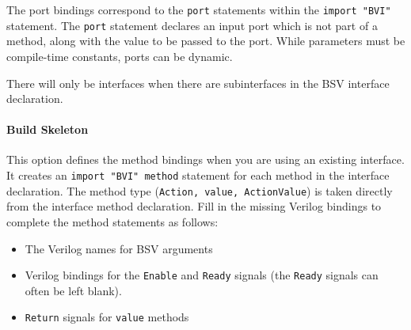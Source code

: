 \documentclass{article}
\newcommand{\te}[1]{\texttt{#1}}
\begin{document}
The port bindings correspond to the \te{port} statements within the
\te{import "BVI"} statement.  The \te{port} statement declares an input
port which is not part of a method, along with the value to be passed
to the port.  While parameters must be compile-time constants, ports
can be dynamic.

There will only be interfaces when there are subinterfaces  in the BSV
interface declaration.


\paragraph{Build Skeleton}
 This option defines the method bindings when you are using an
 existing interface.  It creates an \te{import "BVI" method}
statement for each method in the  interface declaration.  The method
type (\te{Action, value, ActionValue}) is taken directly from the
interface method declaration.  Fill in the missing
Verilog  bindings to complete the method statements as follows:
\begin{itemize}
\item The Verilog names for BSV arguments
\item Verilog bindings for the  \te{Enable} and
\te{Ready} signals (the  \te{Ready} signals can often
be left blank).
\item \te{Return} signals for \te{value} methods
\end{itemize}









\end{document}
